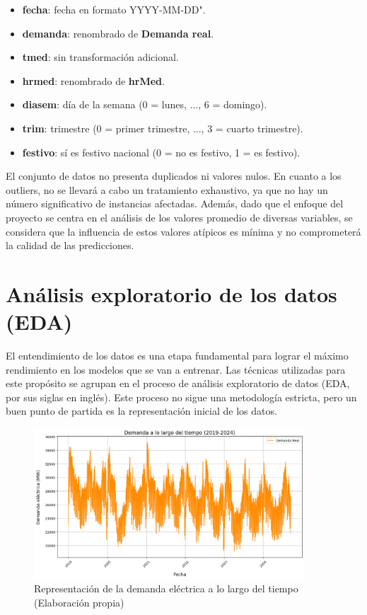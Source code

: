 \documentclass[12pt,a4paper]{report}
\begin{document}
\begin{itemize}
    \item \textbf{fecha}: fecha en formato YYYY-MM-DD".

    \item \textbf{demanda}: renombrado de \textbf{Demanda real}. 

    \item \textbf{tmed}: sin transformación adicional.

    \item \textbf{hrmed}: renombrado de \textbf{hrMed}.

    \item \textbf{diasem}: día de la semana (0 = lunes, ..., 6 = domingo).

    \item \textbf{trim}: trimestre (0 = primer trimestre, ..., 3 = cuarto trimestre).

    \item \textbf{festivo}: sí es festivo nacional (0 = no es festivo, 1 = es festivo).
\end{itemize}

El conjunto de datos no presenta duplicados ni valores nulos. En cuanto a los outliers, no se llevará a cabo un tratamiento exhaustivo, ya que no hay un número significativo de instancias afectadas. Además, dado que el enfoque del proyecto se centra en el análisis de los valores promedio de diversas variables, se considera que la influencia de estos valores atípicos es mínima y no comprometerá la calidad de las predicciones.

\section{Análisis exploratorio de los datos (EDA)}

El entendimiento de los datos es una etapa fundamental para lograr el máximo rendimiento en los modelos que se van a entrenar. Las técnicas utilizadas para este propósito se agrupan en el proceso de análisis exploratorio de datos (EDA, por sus siglas en inglés). Este proceso no sigue una metodología estricta, pero un buen punto de partida es la representación inicial de los datos.

\begin{figure}[H]
    \centering
    \includegraphics[width=0.9\textwidth]{Images/tfm-3.4A.png}
    \caption{Representación de la demanda eléctrica a lo largo del tiempo (Elaboración propia)}
    \label{fig:demanda_tiempo}
\end{figure}
\end{document}
